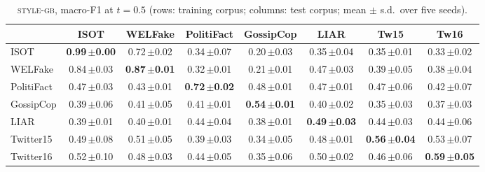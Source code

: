 \begin{table}[h]
\centering
\caption{\textsc{style-gb}, macro-F1 at $t=0.5$ (rows: training corpus; columns: test corpus; mean $\pm$ s.d.\ over five seeds).}
\scriptsize
\begin{tabular}{@{}lccccccc@{}}
\toprule
 & ISOT & WELFake & PolitiFact & GossipCop & LIAR & Tw15 & Tw16 \\
\midrule
ISOT & \textbf{0.99\,{\tiny$\pm$0.00}} & 0.72\,{\tiny$\pm$0.02} & 0.34\,{\tiny$\pm$0.07} & 0.20\,{\tiny$\pm$0.03} & 0.35\,{\tiny$\pm$0.04} & 0.35\,{\tiny$\pm$0.01} & 0.33\,{\tiny$\pm$0.02} \\
WELFake & 0.84\,{\tiny$\pm$0.03} & \textbf{0.87\,{\tiny$\pm$0.01}} & 0.32\,{\tiny$\pm$0.01} & 0.21\,{\tiny$\pm$0.01} & 0.47\,{\tiny$\pm$0.03} & 0.39\,{\tiny$\pm$0.05} & 0.38\,{\tiny$\pm$0.04} \\
PolitiFact & 0.47\,{\tiny$\pm$0.03} & 0.43\,{\tiny$\pm$0.01} & \textbf{0.72\,{\tiny$\pm$0.02}} & 0.48\,{\tiny$\pm$0.01} & 0.47\,{\tiny$\pm$0.01} & 0.47\,{\tiny$\pm$0.06} & 0.42\,{\tiny$\pm$0.07} \\
GossipCop & 0.39\,{\tiny$\pm$0.06} & 0.41\,{\tiny$\pm$0.05} & 0.41\,{\tiny$\pm$0.01} & \textbf{0.54\,{\tiny$\pm$0.01}} & 0.40\,{\tiny$\pm$0.02} & 0.35\,{\tiny$\pm$0.03} & 0.37\,{\tiny$\pm$0.03} \\
LIAR & 0.39\,{\tiny$\pm$0.01} & 0.40\,{\tiny$\pm$0.01} & 0.44\,{\tiny$\pm$0.04} & 0.38\,{\tiny$\pm$0.01} & \textbf{0.49\,{\tiny$\pm$0.03}} & 0.44\,{\tiny$\pm$0.03} & 0.44\,{\tiny$\pm$0.06} \\
Twitter15 & 0.49\,{\tiny$\pm$0.08} & 0.51\,{\tiny$\pm$0.05} & 0.39\,{\tiny$\pm$0.03} & 0.34\,{\tiny$\pm$0.05} & 0.48\,{\tiny$\pm$0.01} & \textbf{0.56\,{\tiny$\pm$0.04}} & 0.53\,{\tiny$\pm$0.07} \\
Twitter16 & 0.52\,{\tiny$\pm$0.10} & 0.48\,{\tiny$\pm$0.03} & 0.44\,{\tiny$\pm$0.05} & 0.35\,{\tiny$\pm$0.06} & 0.50\,{\tiny$\pm$0.02} & 0.46\,{\tiny$\pm$0.06} & \textbf{0.59\,{\tiny$\pm$0.05}} \\
\bottomrule
\end{tabular}
\end{table}

